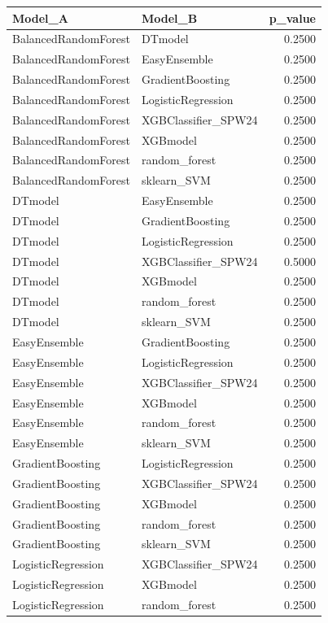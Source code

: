 \begin{table}[t]
\centering
\begin{tabular}{llr}
\toprule
Model_A & Model_B & p_value \\
\midrule
BalancedRandomForest & DTmodel & 0.2500 \\
BalancedRandomForest & EasyEnsemble & 0.2500 \\
BalancedRandomForest & GradientBoosting & 0.2500 \\
BalancedRandomForest & LogisticRegression & 0.2500 \\
BalancedRandomForest & XGBClassifier_SPW24 & 0.2500 \\
BalancedRandomForest & XGBmodel & 0.2500 \\
BalancedRandomForest & random_forest & 0.2500 \\
BalancedRandomForest & sklearn_SVM & 0.2500 \\
DTmodel & EasyEnsemble & 0.2500 \\
DTmodel & GradientBoosting & 0.2500 \\
DTmodel & LogisticRegression & 0.2500 \\
DTmodel & XGBClassifier_SPW24 & 0.5000 \\
DTmodel & XGBmodel & 0.2500 \\
DTmodel & random_forest & 0.2500 \\
DTmodel & sklearn_SVM & 0.2500 \\
EasyEnsemble & GradientBoosting & 0.2500 \\
EasyEnsemble & LogisticRegression & 0.2500 \\
EasyEnsemble & XGBClassifier_SPW24 & 0.2500 \\
EasyEnsemble & XGBmodel & 0.2500 \\
EasyEnsemble & random_forest & 0.2500 \\
EasyEnsemble & sklearn_SVM & 0.2500 \\
GradientBoosting & LogisticRegression & 0.2500 \\
GradientBoosting & XGBClassifier_SPW24 & 0.2500 \\
GradientBoosting & XGBmodel & 0.2500 \\
GradientBoosting & random_forest & 0.2500 \\
GradientBoosting & sklearn_SVM & 0.2500 \\
LogisticRegression & XGBClassifier_SPW24 & 0.2500 \\
LogisticRegression & XGBmodel & 0.2500 \\
LogisticRegression & random_forest & 0.2500 \\

\end{tabular}
\end{table}
